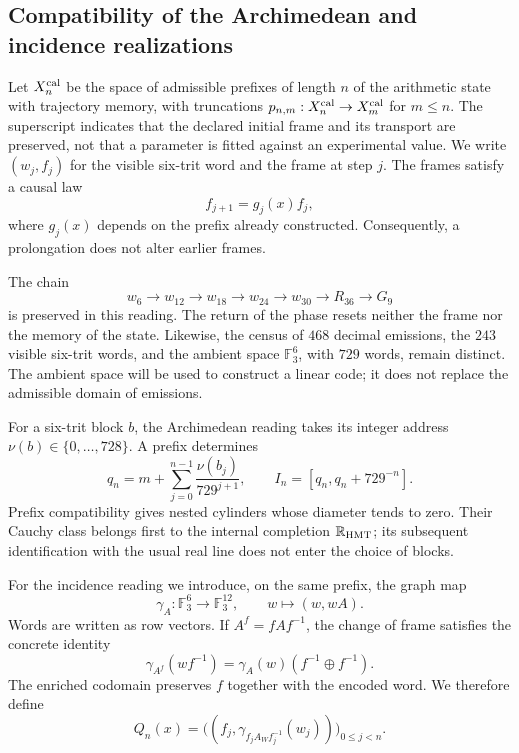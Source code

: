 



\subsection{Compatibility of the Archimedean and incidence realizations}
\label{exc:doble-lectura}

Let $X_n^{\rm cal}$ be the space of admissible prefixes of length $n$ of the
arithmetic state with trajectory memory, with truncations
$p_{n,m}:X_n^{\rm cal}\to X_m^{\rm cal}$ for $m\leq n$. The superscript
indicates that the declared initial frame and its transport are preserved, not
that a parameter is fitted against an experimental value. We write
$(w_j,f_j)$ for the visible six-trit word and the frame at step
$j$. The frames satisfy a causal law
\[
 f_{j+1}=g_j(x)f_j,
\]
where $g_j(x)$ depends on the prefix already constructed. Consequently, a
prolongation does not alter earlier frames.

The chain
\[
 w_6\longrightarrow w_{12}\longrightarrow w_{18}
 \longrightarrow w_{24}\longrightarrow w_{30}
 \longrightarrow R_{36}\longrightarrow G_9
\]
is preserved in this reading. The return of the phase resets neither the
frame nor the memory of the state. Likewise, the
census of $468$ decimal emissions, the $243$ visible six-trit words, and the
ambient space $\mathbb F_3^6$, with $729$ words, remain distinct. The ambient space
will be used to construct a linear code; it does not replace the
admissible domain of emissions.

For a six-trit block $b$, the Archimedean reading takes its
integer address $\nu(b)\in\{0,\ldots,728\}$. A prefix determines
\[
 q_n=m+\sum_{j=0}^{n-1}\frac{\nu(b_j)}{729^{j+1}},
 \qquad I_n=[q_n,q_n+729^{-n}].
\]
Prefix compatibility gives nested cylinders whose diameter tends
to zero. Their Cauchy class belongs first to the internal completion
$\mathbb R_{\rm HMT}$; its subsequent identification with the usual real
line does not enter the choice of blocks.

For the incidence reading we introduce, on the same prefix, the
graph map
\begin{equation}
 \gamma_A:\mathbb F_3^6\longrightarrow\mathbb F_3^{12},
 \qquad w\longmapsto(w,wA).
 \label{exc:gamma}
\end{equation}
Words are written as row vectors. If $A^f=fAf^{-1}$, the
change of frame satisfies the concrete identity
\begin{equation}
 \gamma_{A^f}(wf^{-1})
   =\gamma_A(w)(f^{-1}\oplus f^{-1}).
 \label{exc:covariancia}
\end{equation}
The enriched codomain preserves $f$ together with the encoded word.
We therefore define
\begin{equation}
 Q_n(x)=\bigl((f_j,\gamma_{f_jA_Wf_j^{-1}}(w_j))\bigr)_{0\leq j<n}.
 \label{exc:qn}
\end{equation}

